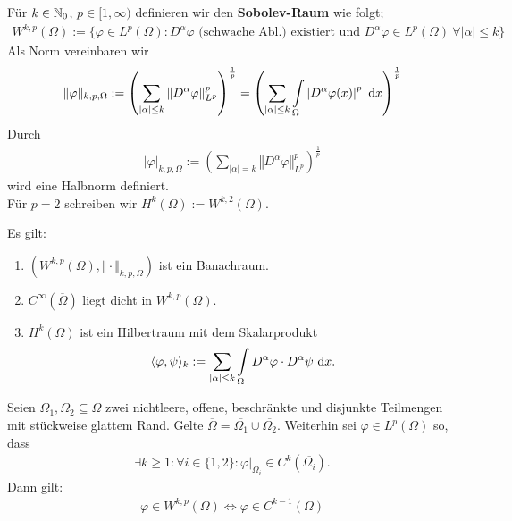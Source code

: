 \begin{definition}
	Für $k\in\mathbb{N}_0$, $p\in[1,\infty)$ definieren wir den \textbf{Sobolev-Raum} wie folgt;
	\begin{align}
		W^{k,p}(\Omega):=\Big\lbrace\varphi\in L^p(\Omega):D^\alpha\varphi\text{ (schwache Abl.) existiert und }D^\alpha\varphi\in L^p(\Omega)~\forall|\alpha|\leq k\Big\rbrace
	\end{align}
	Als Norm vereinbaren wir
	\begin{align*}
		\Vert\varphi\Vert_{k,p,\Omega}:=\left(\sum\limits_{|\alpha|\leq k}\left\Vert D^\alpha\varphi\right\Vert^p_{L^p}\right)^{\frac{1}{p}}
		=\left(\sum\limits_{|\alpha|\leq k}\int\limits_\Omega\left| D^\alpha\varphi(x)\right|^p\text{ d} x\right)^{\frac{1}{p}}
	\end{align*}
	Durch
	\begin{align*}
		|\varphi|_{k,p,\Omega}:=\left(\sum\limits_{|\alpha|= k}\left\Vert D^\alpha\varphi\right\Vert^p_{L^p}\right)^{\frac{1}{p}}
	\end{align*}
	wird eine Halbnorm definiert.\\
	Für $p=2$ schreiben wir $H^k(\Omega):=W^{k,2}(\Omega)$.
\end{definition}

\begin{satz}
	Es gilt:
	\begin{enumerate}
		\item $\left(W^{k,p}(\Omega),\Vert\cdot\Vert_{k,p,\Omega}\right)$ ist ein Banachraum.
		\item $C^\infty(\overline{\Omega})$ liegt dicht in $W^{k,p}(\Omega)$.
		\item $H^k(\Omega)$ ist ein Hilbertraum mit dem Skalarprodukt
		\begin{align*}
			\langle \varphi,\psi\rangle_k:=\sum\limits_{|\alpha|\leq k}\int\limits_\Omega D^\alpha\varphi\cdot D^\alpha\psi\text{ d} x.
		\end{align*}
	\end{enumerate}
\end{satz}

\begin{satz}\label{satz1.4}\enter
	Seien $\Omega_1,\Omega_2\subseteq\Omega$ zwei nichtleere, offene, beschränkte und disjunkte Teilmengen mit stückweise glattem Rand.
	Gelte
	$\overline{\Omega}=\overline{\Omega_1}\cup\overline{\Omega_2}$.
	Weiterhin sei $\varphi\in L^p(\Omega)$ so, dass
	\begin{align*}
		\exists k\geq 1:\forall i\in\lbrace1,2\rbrace:\varphi|_{\Omega_i}\in C^k(\overline{\Omega_i}).
	\end{align*}
	Dann gilt:
	\begin{align*}
		\varphi\in W^{k,p}(\Omega)\Longleftrightarrow\varphi\in C^{k-1}(\Omega)
	\end{align*}
\end{satz}

